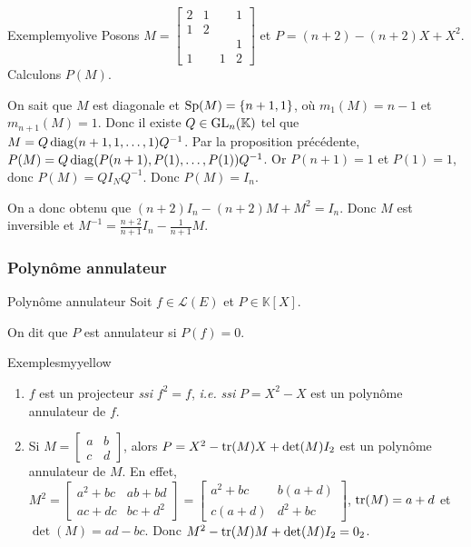     \begin{omed}{Exemple}{myolive}
        Posons $M = \begin{bmatrix}
            2 & 1 & & 1 \\
            1 & 2 & & \\
            & & & 1 \\
            1 & & 1 &2
        \end{bmatrix}$ et $P = (n+2) - (n+2)X + X^2$. Calculons $P(M)$.

        On sait que $M$ est diagonale et $\operatorname{Sp}(M) = \left\{n+1,1\right\}$, où $m_1(M) = n-1$ et $m_{n+1}(M) = 1$. Donc il existe $Q \in \operatorname{GL}_n(\mathbb{K})$ tel que $M = Q \operatorname{diag}(n+1, 1, \ldots, 1) Q^{-1}$. Par la proposition précédente, $P(M) = Q \operatorname{diag}(P(n+1), P(1), \ldots, P(1)) Q^{-1}$. Or $P(n+1) = 1$ et $P(1) = 1$, donc $P(M) = Q I_N Q^{-1}$. Donc $P(M) = I_n$.

        On a donc obtenu que $(n+2) I_n - (n + 2)M + M^2 = I_n$. Donc $M$ est inversible et $M^{-1} = \frac{n+2}{n+1} I_n - \frac{1}{n+1} M$.
    \end{omed}

    \subsubsection{Polynôme annulateur}

    \begin{defi}{Polynôme annulateur}{}
        Soit $f \in \mathcal{L}(E)$ et $P \in \mathbb{K}[X]$.

        On dit que $P$ est annulateur si $P(f) = 0$.
    \end{defi}

    \begin{omed}{Exemples}{myyellow}
        \begin{enumerate}[label=\arabic*.]
            \item $f$ est un projecteur \textit{ssi} $f^2 = f$, \textit{i.e.} \textit{ssi} $P = X^2 - X$ est un polynôme annulateur de $f$.
            \item Si $M = \begin{bmatrix}
                a & b \\
                c & d
            \end{bmatrix}$, alors $P = X^2 - \operatorname{tr}(M) X + \operatorname{det}(M)I_2$ est un polynôme annulateur de $M$. En effet, $M^2 = \begin{bmatrix}
                a^2 + bc & ab + bd \\
                ac + dc & bc + d^2
            \end{bmatrix} = \begin{bmatrix}
                a^2 + bc & b(a+d) \\
                c(a+d) & d^2 + bc
            \end{bmatrix}$, $\operatorname{tr}(M) = a+d$ et $\det(M) = ad - bc$. Donc $M^2 - \operatorname{tr}(M)M + \operatorname{det}(M)I_2 = 0_2$.
        \end{enumerate}
    \end{omed}

